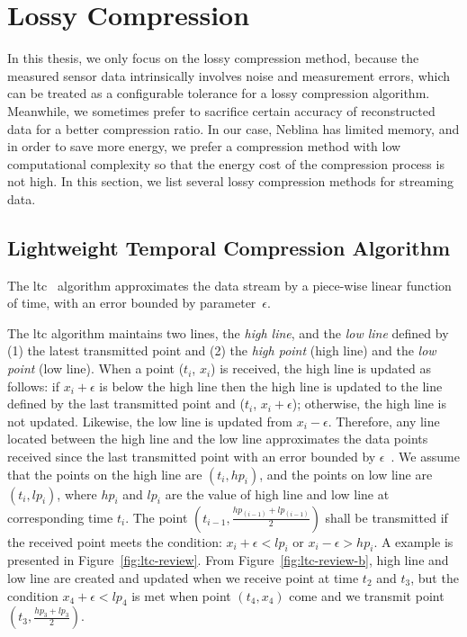 \section{Lossy Compression}
\label{sec:lossy}

In this thesis, we only focus on the lossy compression method, because the
measured sensor data intrinsically involves noise and measurement errors, which
can be treated as a configurable tolerance for a lossy compression algorithm.
Meanwhile, we sometimes prefer to sacrifice certain accuracy of reconstructed
data for a better compression ratio. In our case, Neblina has limited memory,
and in order to save more energy, we prefer a compression method with low
computational complexity so that the energy cost of the compression process is
not high. In this section, we list several lossy compression methods for
streaming data.
\subsection{Lightweight Temporal Compression Algorithm}
\label{sec:ltc}

The \acrfull{ltc}~\cite{schoellhammer2004lightweight}
algorithm approximates the data stream by a piece-wise linear function of time,
with an error bounded by parameter~$\epsilon$.

The \acrshort{ltc} algorithm maintains two lines, the \emph{high line}, and the
\emph{low line} defined by (1) the latest transmitted point and (2) the
\emph{high point} (high line) and the \emph{low point} (low line). When a point
($t_i$, $x_i$) is received, the high line is updated as follows: if
$x_i+\epsilon$ is below the high line then the high line is updated to the line
defined by the last transmitted point and ($t_i$, $x_i+\epsilon$); otherwise,
the high line is not updated. Likewise, the low line is updated from
$x_i-\epsilon$. Therefore, any line located between the high line and the low
line approximates the data points received since the last transmitted point with
an error bounded by $\epsilon$~\cite{schoellhammer2004lightweight}. We assume
that the points on the high line are $(t_i, hp_i)$, and the points on low line
are $(t_i, lp_i)$, where $hp_i$ and $lp_i$ are the value of high line and low
line at corresponding time $t_i$.
The point $(t_{i-1}, \frac{hp_{(i-1)}+lp_{(i-1)}}{2})$ shall be transmitted if
the received point meets the condition:
$x_i+\epsilon < lp_{i}$ or $x_i-\epsilon > hp_{i}$. A example is
presented in Figure~\ref{fig:ltc-review}. From Figure~\ref{fig:ltc-review-b},
high line and low line are created and updated when we receive point at time
$t_2$ and $t_3$, but the condition $x_4+\epsilon < lp_{4}$ is met when point
$(t_4, x_4)$ come and we transmit point $(t_3, \frac{hp_{3}+lp_{3}}{2})$.

